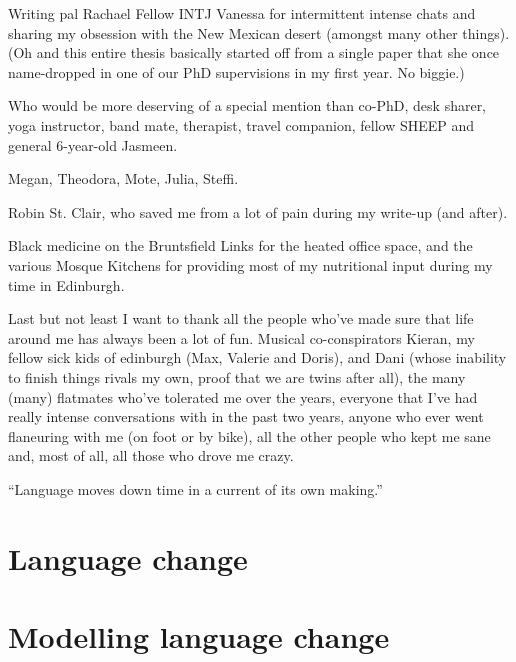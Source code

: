 \documentclass[oneside]{book}
\begin{document}
Writing pal Rachael
Fellow INTJ Vanessa for intermittent intense chats and sharing my obsession with the New Mexican desert (amongst many other things). (Oh and this entire thesis basically started off from a single paper that she once name-dropped in one of our PhD supervisions in my first year. No biggie.)

Who would be more deserving of a special mention than co-PhD, desk sharer, yoga instructor, band mate, therapist, travel companion, fellow SHEEP and general 6-year-old Jasmeen.

Megan, Theodora, Mote, Julia, Steffi.

Robin St. Clair, who saved me from a lot of pain during my write-up (and after).

Black medicine on the Bruntsfield Links for the heated office space, and the various Mosque Kitchens for providing most of my nutritional input during my time in Edinburgh.

Last but not least I want to thank all the people who've made sure that life around me has always been a lot of fun. Musical co-conspirators Kieran, my fellow sick kids of edinburgh (Max, Valerie and Doris), and Dani (whose inability to finish things rivals my own, proof that we are twins after all), the many (many) flatmates who've tolerated me over the years, everyone that I've had really intense conversations with in the past two years, anyone who ever went flaneuring with me (on foot or by bike), all the other people who kept me sane and, most of all, all those who drove me crazy.

\tableofcontents

\listoffigures
\listoftables

\newpage
\thispagestyle{empty}
\epigraph{``Language moves down time in a current of its own making.''}{\citep[p.160]{Sapir1921}}

\mainmatter

\chapter{Language change}
\label{ch:review}



\chapter{Modelling language change}
\label{ch:modelling}


\end{document}
